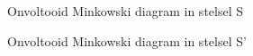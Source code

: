  \begin{figure} [h]
 \begin{center}
 \mbox{\epsfxsize=14cm}
 \caption{Onvoltooid Minkowski diagram in stelsel S}
 \label{f:MinkS}
 \end{center}
 \end{figure}
 
  \begin{figure} [h]
 \begin{center}
 \mbox{\epsfxsize=14cm}
 \caption{Onvoltooid Minkowski diagram in stelsel S'}
 \label{f:MinkSac}
 \end{center}
 \end{figure}

%


